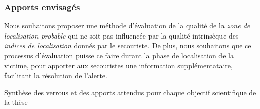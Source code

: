 \subsubsection{Apports envisagés}

Nous souhaitons proposer une méthode d'évaluation de la qualité de la
\emph{zone de localisation probable} qui ne soit pas influencée par la
qualité intrinsèque des \emph{indices de localisation} donnés par le
secouriste. De plus, nous souhaitons que ce processus d'évaluation
puisse ce faire durant la phase de localisation de la victime, pour
apporter aux secouristes une information supplémentataire, facilitant
la résolution de l'alerte.

\begin{table}[h]
  \centering
  
  \caption{Synthèse des verrous et des apports attendus pour chaque
    objectif scientifique de la thèse}
  \label{tab:synthese_objectifs}
\end{table}

